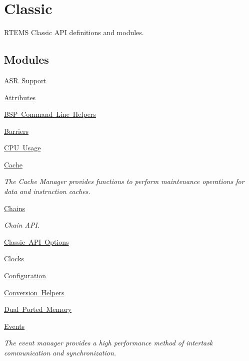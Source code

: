 \hypertarget{group__RTEMSAPIClassic}{}\section{Classic}
\label{group__RTEMSAPIClassic}


R\+T\+E\+MS Classic A\+PI definitions and modules.  


\subsection*{Modules}
\begin{DoxyCompactItemize}
\item 
\mbox{\hyperlink{group__ClassicASR}{A\+S\+R Support}}
\item 
\mbox{\hyperlink{group__ClassicAttributes}{Attributes}}
\item 
\mbox{\hyperlink{group__BSPCommandLine}{B\+S\+P Command Line Helpers}}
\item 
\mbox{\hyperlink{group__ClassicBarrier}{Barriers}}
\item 
\mbox{\hyperlink{group__libmisc__cpuuse}{C\+P\+U Usage}}
\item 
\mbox{\hyperlink{group__ClassicCache}{Cache}}
\begin{DoxyCompactList}\small\item\em The Cache Manager provides functions to perform maintenance operations for data and instruction caches. \end{DoxyCompactList}\item 
\mbox{\hyperlink{group__ClassicChains}{Chains}}
\begin{DoxyCompactList}\small\item\em Chain A\+PI. \end{DoxyCompactList}\item 
\mbox{\hyperlink{group__ClassicOptions}{Classic A\+P\+I Options}}
\item 
\mbox{\hyperlink{group__ClassicClock}{Clocks}}
\item 
\mbox{\hyperlink{group__ClassicConfig}{Configuration}}
\item 
\mbox{\hyperlink{group__libmisc__conv__help}{Conversion Helpers}}
\item 
\mbox{\hyperlink{group__ClassicDPMEM}{Dual Ported Memory}}
\item 
\mbox{\hyperlink{group__ClassicEvent}{Events}}
\begin{DoxyCompactList}\small\item\em The event manager provides a high performance method of intertask communication and synchronization. \end{DoxyCompactList}\item 

\end{DoxyCompactItemize}
